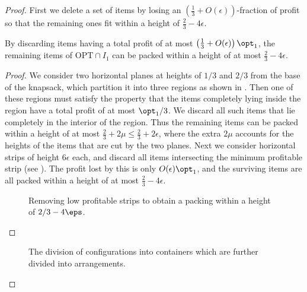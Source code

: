 \begin{proof}
    First we delete a set of items by losing an $(\frac{1}{3}+O(\epsilon))$-fraction of profit so that the remaining ones fit within a height of $\frac{2}{3}-4\epsilon$.

\begin{claim}
\label{lem:optspsmall}
     By discarding items having a total profit of at most $\left(\frac{1}{3}+O(\epsilon)\right)\opt_1$, the remaining items of $\text{OPT}\cap I_1$ can be packed within a height of at most $\frac{2}{3}-4\epsilon$.
\end{claim}
\begin{proof}
    We consider two horizontal planes at heights of $1/3$ and $2/3$ from the base of the knapsack, which partition it into three regions as shown in . Then one of these regions must satisfy the property that the items completely lying inside the region have a total profit of at most $\opt_1/3$. We discard all such items that lie completely in the interior of the region. Thus the remaining items can be packed within a height of at most $\frac{2}{3}+2\mu\le \frac{2}{3}+2\epsilon$, where the extra $2\mu$ accounts for the heights of the items that are cut by the two planes. Next we consider horizontal strips of height $6\epsilon$ each, and discard all items intersecting the minimum profitable strip (see ). The profit lost by this is only $O(\epsilon)\opt_1$, and the surviving items are all packed within a height of at most $\frac{2}{3}-4\epsilon$.
    \begin{figure}
    \centering
    
    \caption{Removing low profitable strips to obtain a packing within a height of $2/3-4\eps$.}
    \label{fig:strip-removal}
\end{figure}
\end{proof}
\begin{figure}
    \centering
		
    \caption{The division of configurations into containers which are further divided into arrangements.}
    \label{fig:jp-configurations}
\end{figure}




\end{proof}
